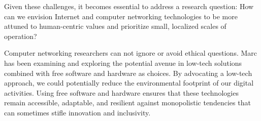 \documentclass[conference]{IEEEtran}
\begin{document}
Given these  challenges, it  becomes essential  to address  a research
question:  How  can  we  envision  Internet  and  computer  networking
technologies to be more attuned to human-centric values and prioritize
small, localized scales of operation?

Computer  networking  researchers  can  not ignore  or  avoid  ethical
questions. Marc has been examining  and exploring the potential avenue
in  low-tech solutions  combined with  free software  and hardware  as
choices.  By  advocating a  low-tech  approach,  we could  potentially
reduce the  environmental footprint  of our digital  activities. Using
free  software and  hardware  ensures that  these technologies  remain
accessible, adaptable,  and resilient against  monopolistic tendencies
that can sometimes stifle innovation and inclusivity.


 
\end{document}
